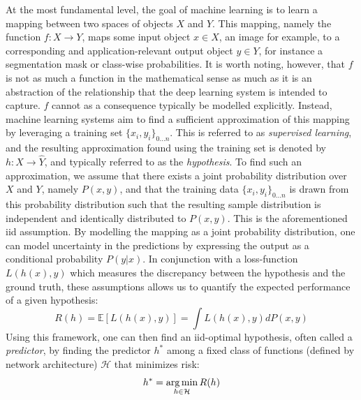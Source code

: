 		At the most fundamental level, the goal of machine learning is to learn a mapping between two spaces of objects \(X\) and \(Y\). This mapping, namely the function \(f: X \rightarrow Y\), maps some input object \(x \in X\), an image for example, to a corresponding and application-relevant output object \(y \in Y\), for instance a segmentation mask or class-wise probabilities. It is worth noting, however, that \(f\) is not as much a function in the mathematical sense as much as it is an abstraction of the relationship that the deep learning system is intended to capture. \(f\) cannot as a consequence typically be modelled explicitly. Instead, machine learning systems aim to find a sufficient approximation of this mapping by leveraging a training set \(\{x_i, y_i\}_{0...n}\). This is referred to as \textit{supervised learning}, and the resulting approximation found using the training set is denoted by \(h: X \rightarrow \hat{Y}\), and typically referred to as the \textit{hypothesis}.  
		To find such an approximation, we assume that there exists a joint probability distribution over \(X\) and \(Y\), namely \(P(x,y)\), and that the training data \(\{x_i, y_i\}_{0...n}\) is drawn from this probability distribution such that the resulting sample distribution is independent and identically distributed to \(P(x,y)\). This is the aforementioned \gls{iid} assumption. By modelling the mapping as a joint probability distribution, one can model uncertainty in the predictions by expressing the output as a conditional probability \(P(y|x)\). In conjunction with a loss-function \(L(h(x),y)\) which measures the discrepancy between the hypothesis and the ground truth, these assumptions allows us to quantify the expected performance of a given hypothesis:
		\begin{equation}
		    R(h) = \mathbb{E}[L(h(x),y)] = \int L(h(x),y) dP(x,y)
		\end{equation}
		Using this framework, one can then find an \gls{iid}-optimal hypothesis, often called a \textit{predictor}, by finding the predictor \(h^*\) among a fixed class of functions (defined by network architecture) \(\mathcal{H}\) that minimizes risk:
		\begin{equation}
		h^* = \operatorname*{arg\,min}_{h \in \mathcal{H}}R(h)
		\end{equation}
		
